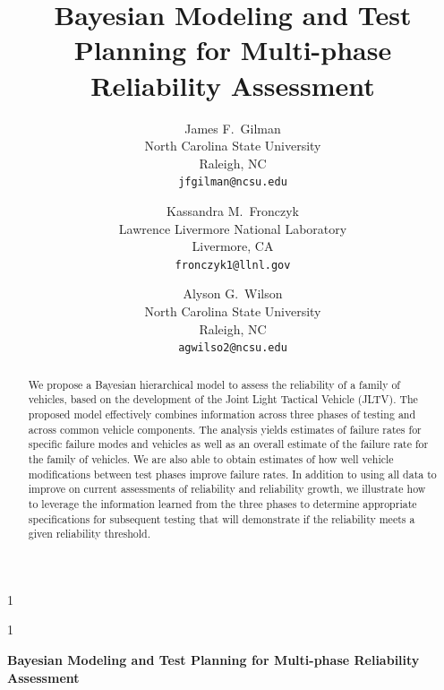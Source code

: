 \documentclass[12pt]{article}
\newcommand{\blind}{1}
\begin{document}
%



\blind
{
\title{Bayesian Modeling and Test Planning for Multi-phase Reliability Assessment}

\author{James F.\ Gilman\\North Carolina State University\\Raleigh, NC\\\texttt{jfgilman@ncsu.edu} \and
Kassandra M.\ Fronczyk\\Lawrence Livermore National Laboratory\\Livermore, CA\\\texttt{fronczyk1@llnl.gov} \and
Alyson G.\ Wilson\\North Carolina State University\\Raleigh, NC\\\texttt{agwilso2@ncsu.edu}}
\maketitle} \fi

\blind
{
  \bigskip
  \bigskip
  \bigskip
  \begin{center}
    {\LARGE\bf Bayesian Modeling and Test Planning for Multi-phase Reliability Assessment}
\end{center}
  \medskip
} \fi

\bigskip

\begin{abstract}
We propose a Bayesian hierarchical model to assess the reliability of a family of vehicles, based on the development of the Joint Light Tactical Vehicle (JLTV). The proposed model effectively combines information across three phases of testing and across common vehicle components. The analysis yields estimates of failure rates for specific failure modes and vehicles as well as an overall estimate of the failure rate for the family of vehicles. We are also able to obtain estimates of how well vehicle modifications between test phases improve failure rates. In addition to using all data to improve on current assessments of reliability and reliability growth, we illustrate how to leverage the information learned from the three phases to determine appropriate specifications for subsequent testing that will demonstrate if the reliability meets a given reliability threshold.
\end{abstract}
\end{document}
